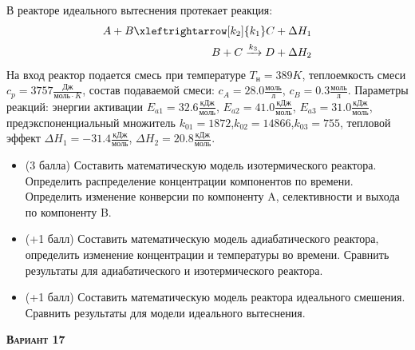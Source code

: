  В реакторе идеального вытеснения протекает реакция: \begin{equation*} \begin{aligned} A+B \xleftrightarrow[k_2]{k_1} C + \Delta H_1 \\ B + C \xrightarrow{k_3} D + \Delta H_2 \end{aligned} \end{equation*}                                На вход  реактор подается смесь при температуре $ T_н =  389 K$, теплоемкость смеси $c_p= 3757 \frac{Дж}{моль \cdot K}$, состав подаваемой смеси: $c_A=28.0 \frac{моль}{л}$, $c_B=0.3 \frac{моль}{л}$. Параметры реакций: энергии активации $E_{a1}=32.6 \frac{кДж}{моль}$, $E_{a2}=41.0  \frac{кДж}{моль}$, $E_{a3}=31.0  \frac{кДж}{моль}$, предэкспоненциальный множитель $k_{01}=      1872$,$k_{02}=     14866$,$k_{03}=       755$, тепловой эффект $\Delta H_1= -31.4  \frac{кДж}{моль}$, $\Delta H_2=20.8 \frac{кДж}{моль}$.\begin{itemize} \item (3 балла) Составить математическую модель изотермического реактора. Определить распределение концентрации компонентов по времени. Определить изменение конверсии по компоненту A, селективности и выхода по компоненту B. \item (+1 балл) Составить математическую модель адиабатического реактора, определить изменение концентрации и температуры во времени. Сравнить результаты для адиабатического и изотермического реактора. \item (+1 балл) Составить математическую модель реактора идеального смешения. Сравнить результаты для модели идеального вытеснения. \end{itemize}

\textsc{\textbf{Вариант 17}}

